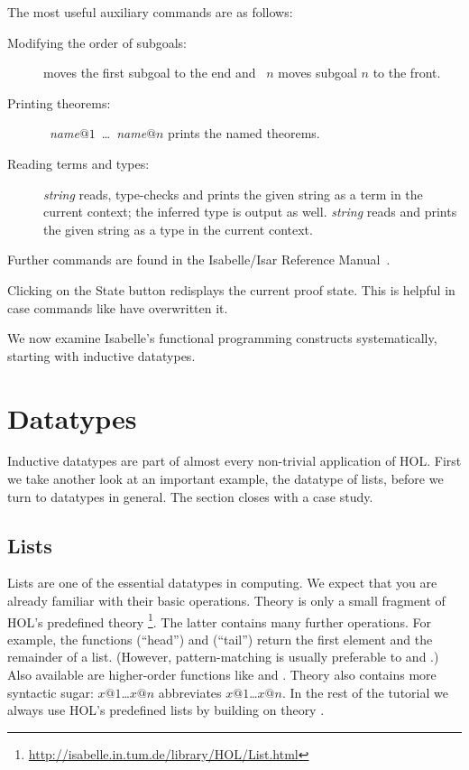 The most useful auxiliary commands are as follows:
\begin{description}
\item[Modifying the order of subgoals:]
 moves the first subgoal to the end and
~$n$ moves subgoal $n$ to the front.
\item[Printing theorems:]
  ~\textit{name}$@1$~\dots~\textit{name}$@n$
  prints the named theorems.
\item[Reading terms and types:] 
  \textit{string} reads, type-checks and prints the given string as a term in
  the current context; the inferred type is output as well.
   \textit{string} reads and prints the given
  string as a type in the current context.
\end{description}
Further commands are found in the Isabelle/Isar Reference
Manual~\cite{isabelle-isar-ref}.

\begin{pgnote}
Clicking on the \textsf{State} button redisplays the current proof state.
This is helpful in case commands like  have overwritten it.
\end{pgnote}

We now examine Isabelle's functional programming constructs systematically,
starting with inductive datatypes.


\section{Datatypes}
\label{sec:datatype}

%
Inductive datatypes are part of almost every non-trivial application of HOL.
First we take another look at an important example, the datatype of
lists, before we turn to datatypes in general. The section closes with a
case study.


\subsection{Lists}

%
Lists are one of the essential datatypes in computing.  We expect that you
are already familiar with their basic operations.
Theory  is only a small fragment of HOL's predefined theory
\footnote{\url{http://isabelle.in.tum.de/library/HOL/List.html}}.
The latter contains many further operations. For example, the functions
 (``head'') and  (``tail'') return the first
element and the remainder of a list. (However, pattern-matching is usually
preferable to  and .)  
Also available are higher-order functions like  and .
Theory  also contains
more syntactic sugar: \isa{[}$x@1$\isa{,}\dots\isa{,}$x@n$\isa{]} abbreviates
$x@1$\isa{\#}\dots\isa{\#}$x@n$\isa{\#[]}.  In the rest of the tutorial we
always use HOL's predefined lists by building on theory .


